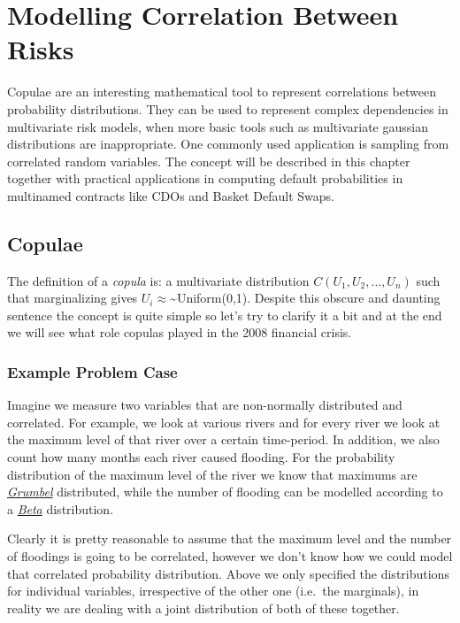 \chapter{Modelling Correlation Between Risks}

Copulae are an interesting mathematical tool to represent correlations between probability distributions. They can be used to represent complex dependencies in multivariate risk models, when more basic tools such as multivariate gaussian distributions are inappropriate. One commonly used application is sampling from correlated random variables.
The concept will be described in this chapter together with practical applications in computing default probabilities in multinamed contracts like CDOs and Basket Default Swaps.

\section{Copulae}

The definition of a \emph{copula} is: a multivariate distribution
\(C(U_1, U_2, \ldots, U_n)\) such that marginalizing gives
\(U_i \approx\)\textasciitilde{}Uniform(0,1). Despite this obscure and
daunting sentence the concept is quite simple so let's try to clarify it
a bit and at the end we will see what role copulas played in the 2008
financial crisis.

\subsection{Example Problem Case}\label{example-problem-case}

Imagine we measure two variables that are non-normally distributed and
correlated. For example, we look at various rivers and for every river
we look at the maximum level of that river over a certain time-period.
In addition, we also count how many months each river caused flooding.
For the probability distribution of the maximum level of the river we
know that maximums are \href{}{\emph{Grumbel}} distributed, while the
number of flooding can be modelled according to a \href{}{\emph{Beta}}
distribution.

Clearly it is pretty reasonable to assume that the maximum level and the
number of floodings is going to be correlated, however we don't know how
we could model that correlated probability distribution. Above we only
specified the distributions for individual variables, irrespective of
the other one (i.e.~the marginals), in reality we are dealing with a
joint distribution of both of these together.

